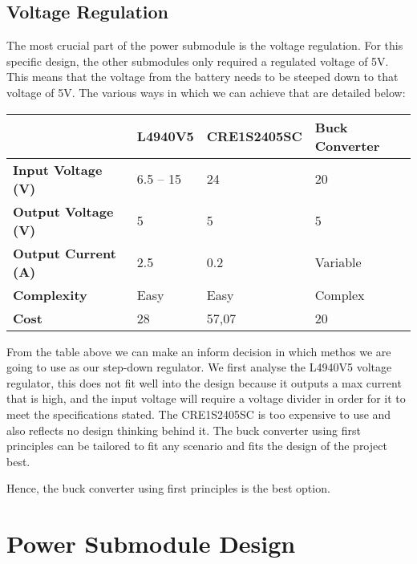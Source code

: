 \documentclass[class=report,11pt,crop=false]{standalone}
\begin{document}
 

\subsection{Voltage Regulation}

The most crucial part of the power submodule is the voltage regulation. For this specific design, the other submodules only required a regulated voltage of 5V. This means that the voltage from the battery needs to be steeped down to that voltage of 5V. The various ways in which we can achieve that are detailed below:

 

 

\begin{table}
\centering

\begin{tabular}{| l | l | l | l |}
\hline
  & \textbf{L4940V5} & \textbf{CRE1S2405SC} & \textbf{Buck Converter} \\
\hline
\textbf{Input Voltage (V)} & 6.5 – 15 & 24 & 20 \\
\hline
\textbf{Output Voltage (V)} & 5 & 5 & 5 \\
\hline
\textbf{Output Current (A)} & 2.5 & 0.2 & Variable \\
\hline
\textbf{Complexity} & Easy & Easy & Complex \\
\hline
\textbf{Cost} & 28 & 57,07 & 20 \\
\hline

\end{tabular}

\end{table}

 From the table above we can make an inform decision in which methos we are going to use as our step-down regulator. We first analyse the L4940V5 voltage regulator, this does not fit well into the design because it outputs a max current that is high, and the input voltage will require a voltage divider in order for it to meet the specifications stated. The CRE1S2405SC is too expensive to use and also reflects no design thinking behind it. The buck converter using first principles can be tailored to fit any scenario and fits the design of the project best.

Hence, the buck converter using first principles is the best option.

\section{Power Submodule Design}
\end{document}

